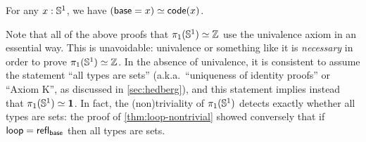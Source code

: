 \documentclass[hott-all.tex]{subfiles}
\begin{document}
% 
% 
\begin{cor}
  For any $x:\mathbb{S}^1$, we have $(\mathsf{base}=x) \simeq \mathsf{code}(x)$.
\end{cor}
% 
% 
\begin{rmk}
  Note that all of the above proofs that $\pi_1(\mathbb{S}^1) \simeq \mathbb{Z}$ use the univalence axiom in an essential way.
  This is unavoidable: univalence or something like it is \emph{necessary} in order to prove $\pi_1(\mathbb{S}^1) \simeq \mathbb{Z}$.
  In the absence of univalence, it is consistent to assume the statement ``all types are sets'' (a.k.a.\ ``uniqueness of identity proofs'' or ``Axiom K'', as discussed in \cref{sec:hedberg}), and this statement implies instead that $\pi_1(\mathbb{S}^1) \simeq \mathbf{1}$.
  In fact, the (non)triviality of $\pi_1(\mathbb{S}^1)$ detects exactly whether all types are sets: the proof of \cref{thm:loop-nontrivial} showed conversely that if $\mathsf{loop}=\mathsf{refl}_{\mathsf{base}}$ then all types are sets.
\end{rmk}
% 
\end{document}

